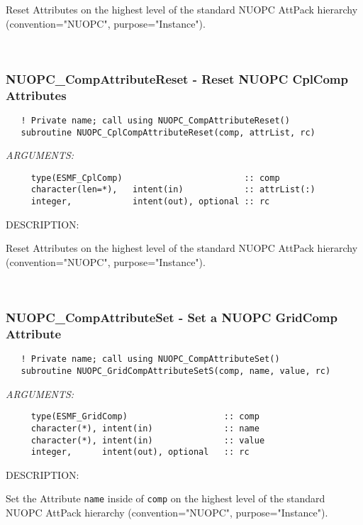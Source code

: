      Reset Attributes on the highest level of the standard NUOPC AttPack
     hierarchy (convention="NUOPC", purpose="Instance"). 
 
\mbox{}\hrulefill\ 
 
\subsubsection [NUOPC\_CompAttributeReset] {NUOPC\_CompAttributeReset - Reset NUOPC CplComp Attributes}


\begin{verbatim}   ! Private name; call using NUOPC_CompAttributeReset() 
   subroutine NUOPC_CplCompAttributeReset(comp, attrList, rc)\end{verbatim}{\em ARGUMENTS:}
\begin{verbatim}     type(ESMF_CplComp)                        :: comp
     character(len=*),   intent(in)            :: attrList(:)
     integer,            intent(out), optional :: rc\end{verbatim}
{\sf DESCRIPTION:\\ }


     Reset Attributes on the highest level of the standard NUOPC AttPack
     hierarchy (convention="NUOPC", purpose="Instance"). 
 
\mbox{}\hrulefill\ 
 
\subsubsection [NUOPC\_CompAttributeSet] {NUOPC\_CompAttributeSet - Set a NUOPC GridComp Attribute}


\begin{verbatim}   ! Private name; call using NUOPC_CompAttributeSet() 
   subroutine NUOPC_GridCompAttributeSetS(comp, name, value, rc)\end{verbatim}{\em ARGUMENTS:}
\begin{verbatim}     type(ESMF_GridComp)                   :: comp
     character(*), intent(in)              :: name
     character(*), intent(in)              :: value
     integer,      intent(out), optional   :: rc\end{verbatim}
{\sf DESCRIPTION:\\ }


     Set the Attribute {\tt name} inside of {\tt comp} on the highest level
     of the standard NUOPC AttPack hierarchy (convention="NUOPC", 
     purpose="Instance").
  
